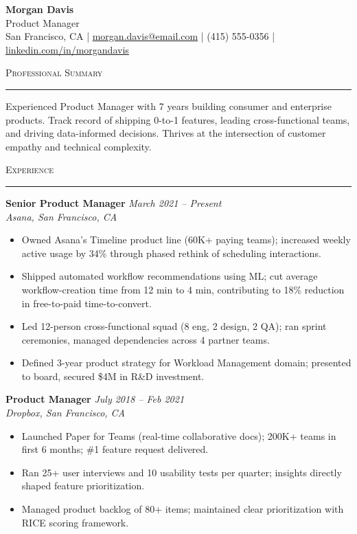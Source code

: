 \documentclass[11pt,a4paper]{article}
\newcommand{\sectionline}{\par\vspace{1pt}\noindent\rule{\textwidth}{0.4pt}\par\vspace{3pt}\noindent}
\begin{document}
\begin{center}
  {\LARGE \textbf{Morgan Davis}}\\[5pt]
  Product Manager\\[3pt]
  San Francisco, CA \quad|\quad
  \href{mailto:morgan.davis@email.com}{morgan.davis@email.com} \quad|\quad
  (415) 555-0356 \quad|\quad
  \href{https://linkedin.com/in/morgandavis}{linkedin.com/in/morgandavis}
\end{center}

\vspace{6pt}
\noindent\textsc{Professional Summary}
\sectionline
Experienced Product Manager with 7 years building consumer and enterprise products. Track record of shipping 0-to-1 features, leading cross-functional teams, and driving data-informed decisions. Thrives at the intersection of customer empathy and technical complexity.

\vspace{4pt}
\noindent\textsc{Experience}
\sectionline

\noindent\textbf{Senior Product Manager} \hfill \textit{March 2021 -- Present}\\
\textit{Asana, San Francisco, CA}
\begin{itemize}
  \item Owned Asana's Timeline product line (60K+ paying teams); increased weekly active usage by 34\% through phased rethink of scheduling interactions.
  \item Shipped automated workflow recommendations using ML; cut average workflow-creation time from 12 min to 4 min, contributing to 18\% reduction in free-to-paid time-to-convert.
  \item Led 12-person cross-functional squad (8 eng, 2 design, 2 QA); ran sprint ceremonies, managed dependencies across 4 partner teams.
  \item Defined 3-year product strategy for Workload Management domain; presented to board, secured \$4M in R\&D investment.
\end{itemize}

\vspace{4pt}
\noindent\textbf{Product Manager} \hfill \textit{July 2018 -- Feb 2021}\\
\textit{Dropbox, San Francisco, CA}
\begin{itemize}
  \item Launched Paper for Teams (real-time collaborative docs); 200K+ teams in first 6 months; \#1 feature request delivered.
  \item Ran 25+ user interviews and 10 usability tests per quarter; insights directly shaped feature prioritization.
  \item Managed product backlog of 80+ items; maintained clear prioritization with RICE scoring framework.
\end{itemize}
\end{document}
